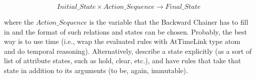 \begin{enumerate}
\begin{equation}
Initial\_State \times Action\_Sequence \rightarrow Final\_State 
\end{equation}

where the $Action\_Sequence$ is the variable that the Backward Chainer has to fill in and the format of such relations and states can be chosen. 
Probably, the best way is to use time (i.e., wrap the evaluated rules with AtTimeLink type atom and do temporal reasoning). 
Alternatively, describe a state explicitly (as a sort of list of attribute states, such as hold, clear, etc.), and have rules that take that state in addition to its arguments (to be, again, immutable).

\end{enumerate}
